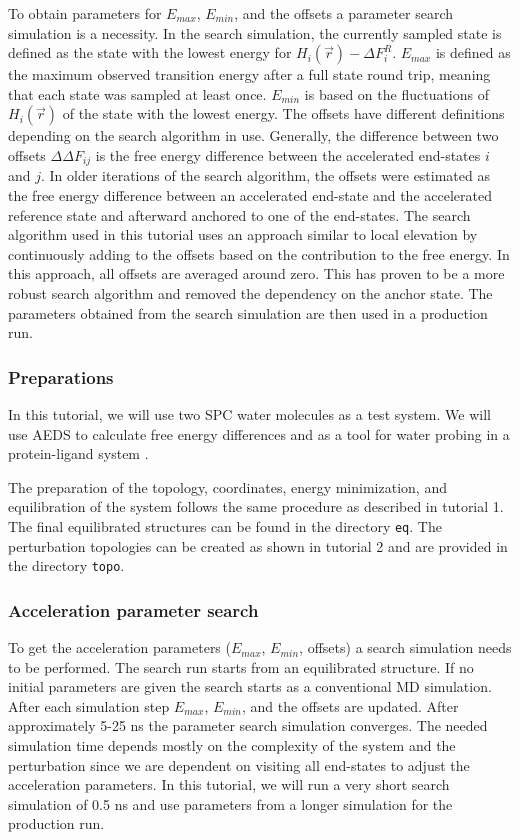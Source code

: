 To obtain parameters for $E_{max}$, $E_{min}$, and the offsets a parameter search simulation is a necessity. In the search simulation, the currently sampled state is defined as the state with the lowest energy for $H_i(\vec{r}) - \Delta F_{i}^R$. $E_{max}$ is defined as the maximum observed transition energy after a full state round trip, meaning that each state was sampled at least once. $E_{min}$ is based on the fluctuations of $H_i(\vec{r})$ of the state with the lowest energy. The offsets have different definitions depending on the search algorithm in use. Generally, the difference between two offsets $\Delta\Delta F_{ij}$ is the free energy difference between the accelerated end-states $i$ and $j$. In older iterations of the search algorithm, the offsets were estimated as the free energy difference between an accelerated end-state and the accelerated reference state and afterward anchored to one of the end-states. The search algorithm used in this tutorial uses an approach similar to local elevation by continuously adding to the offsets based on the contribution to the free energy. In this approach, all offsets are averaged around zero. This has proven to be a more robust search algorithm and removed the dependency on the anchor state. The parameters obtained from the search simulation are then used in a production run.

\subsubsection{Preparations}
In this tutorial, we will use two SPC water molecules as a test system. We will use AEDS to calculate free energy differences and as a tool for water probing in a protein-ligand system \cite{gracia1}.   
 
The preparation of the topology, coordinates, energy minimization, and equilibration of the system follows the same procedure as described in tutorial 1.
The final equilibrated structures can be found in the directory \texttt{eq}. The perturbation topologies can be created as shown in tutorial 2 and are provided in the directory \texttt{topo}.

\subsubsection{Acceleration parameter search}
To get the acceleration parameters ($E_{max}$, $E_{min}$, offsets) a search simulation needs to be performed. The search run starts from an equilibrated structure. If no initial parameters are given the search starts as a conventional MD simulation. After each simulation step $E_{max}$, $E_{min}$, and the offsets are updated. After approximately 5-25 ns the parameter search simulation converges. The needed simulation time depends mostly on the complexity of the system and the perturbation since we are dependent on visiting all end-states to adjust the acceleration parameters. In this tutorial, we will run a very short search simulation of 0.5 ns and use parameters from a longer simulation for the production run.  

